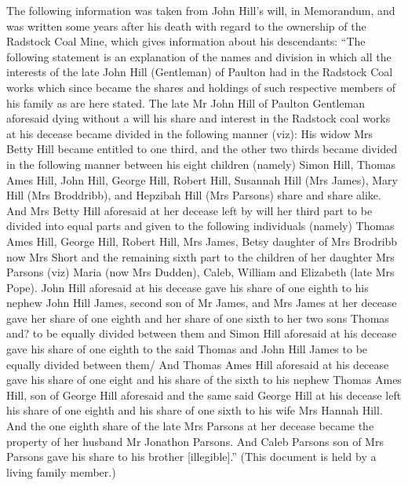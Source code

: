 The following information was taken from John Hill's will, in Memorandum, and was  written some years after his death with regard to the ownership of the Radstock Coal Mine, which gives information about his descendants: ``The following statement is an explanation of the names and division in which all the interests of the late John Hill (Gentleman) of Paulton had in the Radstock Coal works which since became the shares and holdings of such respective members of his family as are here stated. The late Mr John Hill of Paulton Gentleman aforesaid dying without a will his share and interest in the Radstock coal works at his decease became divided in the following manner (viz): His widow Mrs Betty Hill became entitled to one third, and the other two thirds became divided in the following manner between his eight children (namely) Simon Hill, Thomas Ames Hill, John Hill, George Hill, Robert Hill, Susannah Hill (Mrs James), Mary Hill (Mrs Broddribb), and Hepzibah Hill (Mrs Parsons) share and share alike. And Mrs Betty Hill aforesaid at her decease left by will her third part to be divided into equal parts and given to the following individuals (namely) Thomas Ames Hill, George Hill, Robert Hill, Mrs James, Betsy daughter of Mrs Brodribb now Mrs Short and the remaining sixth part to the children of her daughter Mrs Parsons (viz) Maria (now Mrs Dudden), Caleb, William and Elizabeth (late Mrs Pope). John Hill aforesaid at his decease gave his share of one eighth to his nephew John Hill James, second son of Mr James, and Mrs James at her decease gave her share of one eighth and her share of one sixth to her two sons Thomas and? to be equally divided between them and Simon Hill aforesaid at his decease gave his share of one eighth to the said Thomas and John Hill James to be equally divided between them/ And Thomas Ames Hill aforesaid at his decease gave his share of one eight and his share of the sixth to his nephew Thomas Ames Hill, son of George Hill aforesaid and the same said George Hill at his decease left his share of one eighth and his share of one sixth to his wife Mrs Hannah Hill. And the one eighth share of the late Mrs Parsons at her decease became the property of her husband Mr Jonathon Parsons. And Caleb Parsons son of Mrs Parsons gave his share to his brother [illegible].'' (This document is held by a living family member.)
